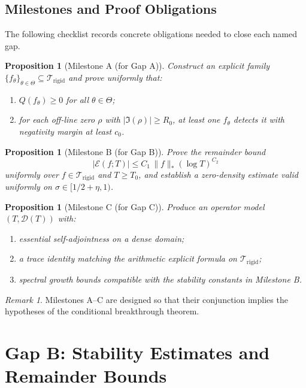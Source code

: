 \documentclass[11pt]{article}
\theoremstyle{plain}
\newtheorem{proposition}[theorem]{Proposition}
\theoremstyle{definition}
\theoremstyle{remark}
\newtheorem{remark}[theorem]{Remark}
\begin{document}
\subsection*{Milestones and Proof Obligations}
The following checklist records concrete obligations needed to close each named gap.

\begin{proposition}[Milestone A (for Gap A)]
Construct an explicit family $\{f_{\theta}\}_{\theta\in\Theta}\subseteq\mathcal{T}_{\mathrm{rigid}}$ and
prove uniformly that:
\begin{enumerate}
  \item $Q(f_{\theta})\ge 0$ for all $\theta\in\Theta$;
  \item for each off-line zero $\rho$ with $|\Im(\rho)|\ge R_0$, at least one $f_{\theta}$ detects it with
  negativity margin at least $c_0$.
\end{enumerate}
\end{proposition}

\begin{proposition}[Milestone B (for Gap B)]
Prove the remainder bound
\[
|\mathcal{E}(f;T)| \le C_1\,\|f\|_{\ast}(\log T)^{C_2}
\]
uniformly over $f\in\mathcal{T}_{\mathrm{rigid}}$ and $T\ge T_0$, and establish a zero-density estimate
valid uniformly on $\sigma\in[1/2+\eta,1)$.
\end{proposition}

\begin{proposition}[Milestone C (for Gap C)]
Produce an operator model $(T,\mathcal{D}(T))$ with:
\begin{enumerate}
  \item essential self-adjointness on a dense domain;
  \item a trace identity matching the arithmetic explicit formula on $\mathcal{T}_{\mathrm{rigid}}$;
  \item spectral growth bounds compatible with the stability constants in Milestone B.
\end{enumerate}
\end{proposition}

\begin{remark}
Milestones A--C are designed so that their conjunction implies the hypotheses of the
conditional breakthrough theorem.
\end{remark}

\section{Gap B: Stability Estimates and Remainder Bounds}
\end{document}
